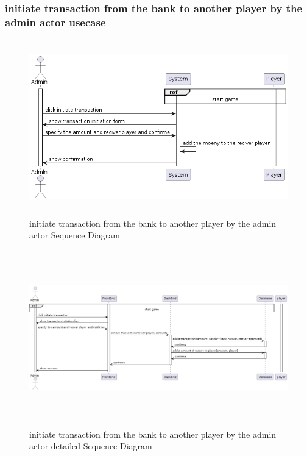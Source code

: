 \documentclass{article}
\begin{document}
\subsubsection{initiate transaction from the bank to another player by the admin actor usecase}
\begin{figure}[H]
	\centering
	\includegraphics[height=3in]{../thesis_tex/assets/diagrams/initiate_transaction_to_another_player_SD.png}
	\caption{initiate transaction from the bank to another player by the admin actor Sequence Diagram}
\end{figure}

\begin{figure}[H]
	\centering
	\includegraphics[height=3in,width=6in]{../thesis_tex/assets/diagrams/initiate_transaction_to_another_player_detailedSD.png}
	\caption{initiate transaction from the bank to another player by the admin actor detailed Sequence Diagram}
\end{figure}
\end{document}
